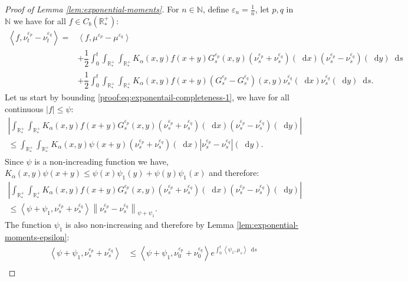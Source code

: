 \documentclass[11pt,a4paper]{article}
\newcommand{\NN}{\mathbb{N}}
\newcommand{\RRP}{\mathbb{R}^+_*}
\newcommand{\brac}[1]{\left\langle#1\right\rangle}
\newcommand{\dd}{\mathop{}\!\mathrm{d}}
\begin{document}
\begin{proof}[Proof of Lemma \ref{lem:exponential-moments}]
    For $n\in \NN$, define $\varepsilon_n = \frac1n$, let $p,q$ in $\NN$ we have for all $f \in C_b(\RRP)$:
    \begin{subequations}
    \begin{align}
        \brac{f,\nu_t^{\varepsilon_p}-\nu_t^{\varepsilon_q}} =& \brac{f,\mu^{\varepsilon_p} - \mu^{\varepsilon_q}} 
        \nonumber \\
        &+ \dfrac12\int_0^t \int_{\RRP}\int_{\RRP}K_\alpha(x,y)f(x+y) G^{\varepsilon_p}_s(x,y)(\nu_s^{\varepsilon_p} + \nu_s^{\varepsilon_q})(\dd x)(\nu_s^{\varepsilon_p} -\nu_s^{\varepsilon_q} )(\dd y)\dd s \label{proof:eq:exponentail-completeness-1}\\
        &+ \dfrac12\int_0^t\int_{\RRP}\int_{\RRP}K_\alpha(x,y)f(x+y) (G^{\varepsilon_p}_s - G^{\varepsilon_q}_s)(x,y)\nu_s^{\varepsilon_q}(\dd x)\nu_s^{\varepsilon_q}(\dd y) \dd s.\label{proof:eq:exponentail-completeness-2}
    \end{align}
    \label{proof:eq:exponentail-completeness}
    \end{subequations}
    Let us start by bounding \eqref{proof:eq:exponentail-completeness-1}, we have for all continuous $|f| \leq \psi$:
    \begin{multline*}
        \left|\int_{\RRP}\int_{\RRP}K_\alpha(x,y)f(x+y) G^{\varepsilon_p}_s(x,y)(\nu_s^{\varepsilon_p} + \nu_s^{\varepsilon_q})(\dd x)(\nu_s^{\varepsilon_p} -\nu_s^{\varepsilon_q} )(\dd y)\right| \\
        \leq \int_{\RRP}\int_{\RRP}K_\alpha(x,y)\psi(x+y) (\nu_s^{\varepsilon_p} + \nu_s^{\varepsilon_q})(\dd x)\left|\nu_s^{\varepsilon_p} -\nu_s^{\varepsilon_q} \right|(\dd y).
    \end{multline*}
    Since $\psi$ is a non-increading function we have, $K_\alpha(x,y)\psi(x+y) \leq \psi(x)\psi_1(y) + \psi(y)\psi_1(x)$ and therefore:
    \begin{multline*}
        \left|\int_{\RRP}\int_{\RRP}K_\alpha(x,y)f(x+y) G^{\varepsilon_p}_s(x,y)(\nu_s^{\varepsilon_p} + \nu_s^{\varepsilon_q})(\dd x)\left(\nu_s^{\varepsilon_p} -\nu_s^{\varepsilon_q}\right)(\dd y)\right| \\
        \leq \brac{\psi + \psi_1, \nu_s^{\varepsilon_p} + \nu_s^{\varepsilon_q}} \left\|\nu_s^{\varepsilon_p} - \nu_s^{\varepsilon_q} \right\|_{\psi + \psi_1}.
    \end{multline*}
    The function $\psi_1$ is also non-increasing and therefore by Lemma \ref{lem:exponential-moments-epsilon}:
    \begin{align*}
        \brac{\psi + \psi_1, \nu_s^{\varepsilon_p} + \nu_s^{\varepsilon_q}} &\leq \brac{\psi + \psi_1, \nu_0^{\varepsilon_p} + \nu_0^{\varepsilon_q}} e^{\int_0^t \brac{\psi_1,\mu_s}\dd s}\\

\end{align*}
\end{proof}
\end{document}
